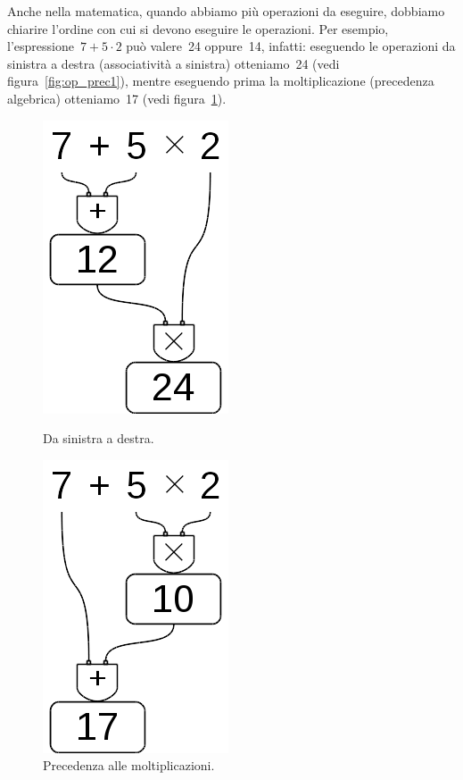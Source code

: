 Anche nella matematica, quando abbiamo più operazioni da eseguire, dobbiamo 
chiarire l'ordine con cui si devono eseguire le operazioni. 
Per esempio, l'espressione~$7+5\cdot2$ può valere~24 oppure~14, infatti:
eseguendo le operazioni da sinistra a destra (associatività a sinistra) 
otteniamo~24 (vedi figura~\ref{fig:op_prec1}), 
mentre eseguendo prima la moltiplicazione (precedenza algebrica) otteniamo~17
(vedi figura~\ref{fig:op_prec2}).
 
\begin{inaccessibleblock}[]
\begin{figure}[h]
 \centering
 \begin{minipage}[t]{.40\textwidth}
  \centering\includegraphics[scale=0.35]{img/op_prec1.png}
  \caption{Da sinistra a destra.}\label{fig:op_prec1}
 \end{minipage}\hfil
 \begin{minipage}[t]{.50\textwidth}
  \centering\includegraphics[scale=0.35]{img/op_prec2.png}
  \caption{Precedenza alle moltiplicazioni.}\label{fig:op_prec2}
 \end{minipage}
\end{figure}
\end{inaccessibleblock}

